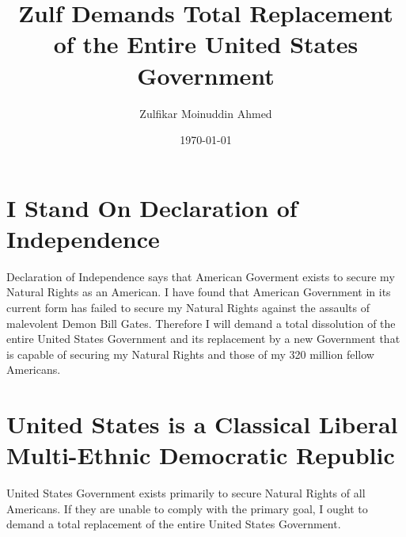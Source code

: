 \documentclass{amsart}
\title{Zulf Demands Total Replacement of the Entire United States Government}
\author{Zulfikar Moinuddin Ahmed}
\date{\today}
\begin{document}
\maketitle

\section{I Stand On Declaration of Independence}

Declaration of Independence says that American Goverment exists to secure my Natural Rights as an American.  I have found that American Government in its current form has failed to secure my Natural Rights against the assaults of malevolent Demon Bill Gates.  Therefore I will demand a total dissolution of the entire United States Government and its replacement by a new Government that is capable of securing my Natural Rights and those of my 320 million fellow Americans.  

\section{United States is a Classical Liberal Multi-Ethnic Democratic Republic}

United States Government exists primarily to secure Natural Rights of all Americans.  If they are unable to comply with the primary goal, I ought to demand a total replacement of the entire United States Government.
\end{document}
